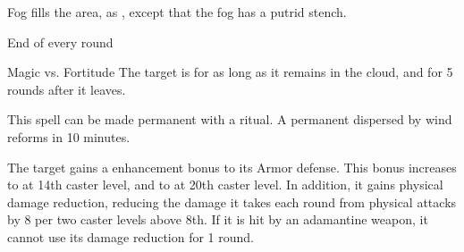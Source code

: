 \begin{spellheader}
    \spelldur{\durshort}
\end{spellheader}
\begin{spelleffects}
    \spelleffect Fog fills the area, as , except that the fog has a putrid stench.
    \begin{spelltrigger}{End of every round}
        \begin{spellattack}{Magic vs. Fortitude}
            \spellsuccess The target is \sickened for as long as it remains in the cloud, and for 5 rounds after it leaves.
        \end{spellattack}
    \end{spelltrigger}
\end{spelleffects}
\begin{spellfooter}
    \spellnotes This spell can be made permanent with a  ritual. A permanent  dispersed by wind reforms in 10 minutes. \fogspellnotes \fogwindspellnotes
\end{spellfooter}

\begin{spellheader}
    \spelldur{\durshort}
\end{spellheader}
\begin{spelleffects}
    \spelleffect The target gains a  enhancement bonus to its Armor defense. This bonus increases to  at 14th caster level, and to  at 20th caster level. In addition, it gains physical damage reduction, reducing the damage it takes each round from physical attacks by 8  per two caster levels above 8th. If it is hit by an adamantine weapon, it cannot use its damage reduction for 1 round.
\end{spelleffects}
\begin{spellfooter}

\end{spellfooter}

